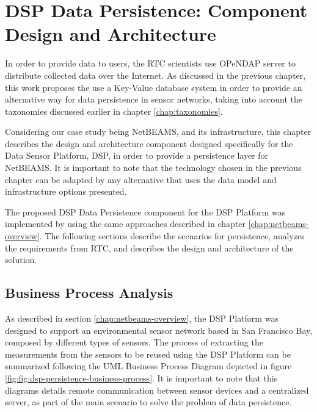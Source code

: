 

\chapter{DSP Data Persistence: Component Design and Architecture}

In order to provide data to users, the RTC scientists use OPeNDAP \cite{opendap}
server to distribute collected data over the Internet. As discussed in the
previous chapter, this work proposes the use a Key-Value database system
in order to provide an alternative way for data persistence in sensor
networks, taking into account the taxonomies discussed earlier in chapter 
\ref{chap:taxonomies}. 

Considering our case study being NetBEAMS, and its infrastructure, this chapter
describes the design and architecture component designed specifically for the
Data Sensor Platform, DSP, in order to provide a persistence layer for
NetBEAMS. It is important to note that the technology chosen in the previous
chapter can be adapted by any alternative that uses the data model and
infrastructure options presented.

The proposed DSP Data Persistence component for the DSP Platform was
implemented by using the same approaches described in chapter
\ref{chap:netbeams-overview}. The following sections describe the scenarios
for persistence, analyzes the requirements from RTC, and describes the design
and architecture of the solution.

\section{Business Process Analysis}
\label{sec:business-process-analysis}
As described in section \ref{chap:netbeams-overview}, the DSP Platform was
designed to support an environmental sensor network based in San Francisco
Bay, composed by different types of sensors. The process of extracting the
measurements from the sensors to be reused using the DSP Platform can be
summarized following the UML Business Process Diagram \cite{uml} depicted in
figure \ref{fig:fig:dsp-persistence-business-process}. It is important to note
that this diagrams details remote communication between sensor devices and a
centralized server, as part of the main scenario to solve the problem of data
persistence.

